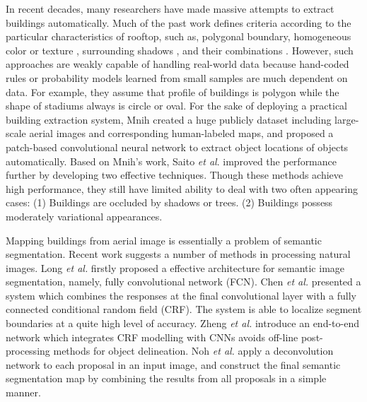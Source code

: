 \documentclass[runningheads]{llncs}
\begin{document}
   In recent decades, many researchers have made massive attempts to extract buildings automatically. Much of the past work defines criteria according to the particular   characteristics of rooftop, such as, polygonal boundary\cite{noronha2001detection,nosrati2009novel,izadi2012three,wang2015efficient}, homogeneous color or texture \cite{cote2013automatic}, surrounding shadows \cite{B2008Building,ok2013automated,chen2014shadow,ngoautomatic}, and their combinations \cite{baluyan2013novel,li2015robust}. However, such approaches are weakly capable of handling real-world data because hand-coded rules or probability models learned from small samples are much dependent on data. For example, they assume that profile of buildings is polygon while the shape of stadiums always is circle or oval. For the sake of deploying a practical building extraction system, Mnih \cite{Mnih2013Machine} created a huge publicly dataset including large-scale aerial images and corresponding human-labeled maps, and proposed a patch-based convolutional neural network to extract object locations of objects automatically. Based on Mnih's work, Saito \textit{et al}. \cite{Saito2016Multiple} improved the performance further by developing two effective techniques. Though these methods achieve high performance, they still have limited ability to deal with two often appearing cases: (1) Buildings are  occluded by shadows or trees. (2) Buildings possess moderately variational appearances. 
      
   Mapping buildings from aerial image is essentially a problem of semantic segmentation. Recent work suggests a number of methods in processing natural images. Long \textit{et al.} \cite{Long2014Fully} firstly proposed a effective architecture for semantic image segmentation, namely, fully convolutional network (FCN).  
Chen \textit{et al.} \cite{chen14semantic} presented a system which combines the responses at the final convolutional layer with a fully connected conditional random field (CRF). The system is able to localize segment boundaries at a quite high level of accuracy. Zheng \textit{et al.} \cite{Zheng2015Conditional} introduce an end-to-end network  which integrates CRF modelling with CNNs avoids off-line post-processing methods for object delineation. Noh \textit{et al.} \cite{Noh2015Learning} apply a deconvolution network to each proposal in an input image, and construct the final semantic segmentation map by combining the results from all proposals in a simple manner.
     
\end{document}
